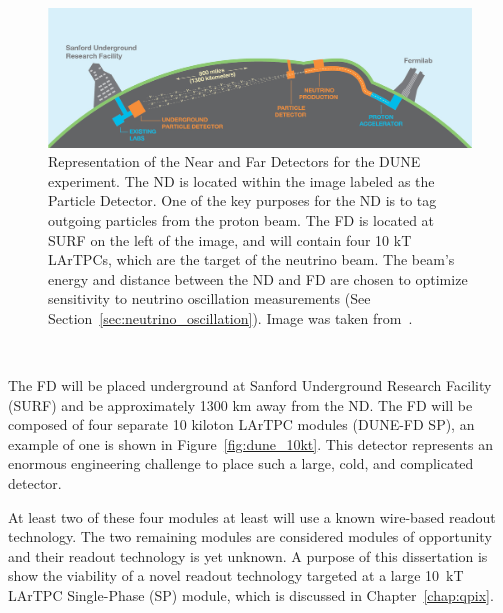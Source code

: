 \begin{figure}[]
\centering
\includegraphics[width=\textwidth]{images/LBNE_Graphic_061615_2016.jpg}
\caption{Representation of the Near and Far Detectors for the DUNE experiment.
The ND is located within the image labeled as the Particle Detector.
One of the key purposes for the ND is to tag outgoing particles from the proton beam.
The FD is located at SURF on the left of the image, and will contain four 10 kT LArTPCs, which are the target of the neutrino beam.
The beam's energy and distance between the ND and FD are chosen to optimize sensitivity to neutrino oscillation measurements (See Section~\ref{sec:neutrino_oscillation}).
Image was taken from~\citep{dune_cdr_2016_arxiv}.}
\end{figure}~\label{fig:dune_fd_image}

The FD will be placed underground at Sanford Underground Research Facility (SURF) and be approximately 1300 km away from the ND.
The FD will be composed of four separate 10 kiloton LArTPC modules (DUNE-FD SP), an example of one is shown in Figure~\ref{fig:dune_10kt}.
This detector represents an enormous engineering challenge to place such a large, cold, and complicated detector.

At least two of these four modules at least will use a known wire-based readout technology.
The two remaining modules are considered modules of opportunity and their readout technology is yet unknown.
A purpose of this dissertation is show the viability of a novel readout technology targeted at a large 10~\unit{kT} LArTPC Single-Phase (SP) module, which is discussed in Chapter~\ref{chap:qpix}.

